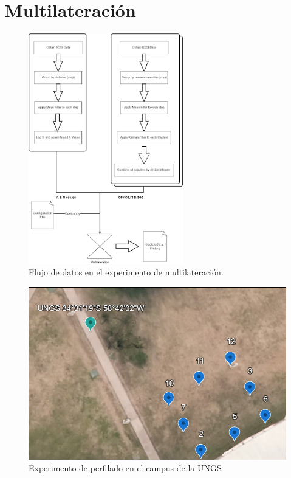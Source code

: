 \section{Multilateración}

\begin{figure}[!htb]
    \centering
    \includegraphics[width=0.6\textwidth]{Figuras/infraestructure/infra-diagram.png}
    \captionsetup{margin=2cm}
    \caption[Flujo de datos]{Flujo de datos en el experimento de multilateración.}
    \label{fig:infra-diagram}
\end{figure}
\begin{figure}[!htb]
	\centering
\includegraphics{Figuras/fieldwork/trilateration.png}
	\captionsetup{margin=2cm}
	\caption[Perfilado]{Experimento de perfilado en el campus de la UNGS}
	\label{fig:arduino-profiling-setup}
\end{figure}
